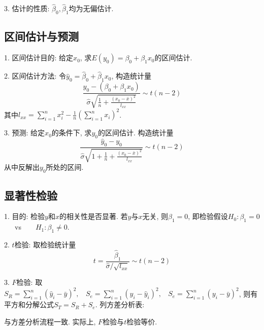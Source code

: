 3. 估计的性质: $\hat{\beta}_0,\hat{\beta}_1$均为无偏估计.

\subsection{区间估计与预测}

1. 区间估计目的: 给定$x_0$, 求$E(y_0)=\beta_0+\beta_1x_0$的区间估计.

2. 区间估计方法: 令$\hat{y}_0=\hat{\beta}_0+\hat{\beta}_1 x_0$, 构造统计量
\begin{equation*}
    \frac{\hat{y}_0-(\beta_0+\beta_1 x_0)}{\hat{\sigma}\sqrt{\frac{1}{n}+\frac{(x_0-\bar{x})^2}{l_{xx}}}} \sim t(n-2)
\end{equation*}
其中$l_{xx}=\sum\limits_{i=1}^n x_i^2-\frac{1}{n}(\sum\limits_{i=1}^n x_i)^2$.

3. 预测: 给定$x_0$的条件下, 求$y_0$的区间估计. 构造统计量
\begin{equation*}
    \frac{\hat{y}_0-y_0}{\hat{\sigma}\sqrt{1+\frac{1}{n}+\frac{(x_0-\bar{x})^2}{l_{xx}}}} \sim t(n-2)
\end{equation*}
从中反解出$y_0$所处的区间.

\subsection{显著性检验}

1. 目的: 检验$y$和$x$的相关性是否显著. 若$y$与$x$无关, 则$\beta_1=0$, 即检验假设$H_0:\beta_1=0$~~~vs~~~~$H_1:\beta_1 \neq 0$.

2. $t$检验: 取检验统计量
\begin{equation*}
    t=\frac{\hat{\beta}_1}{\hat{\sigma}/\sqrt{l_{xx}}} \sim t(n-2)
\end{equation*}

3. $F$检验: 取$S_R=\sum\limits_{i=1}^n (\hat{y}_i-\bar{y})^2,~~~~ S_e=\sum\limits_{i=1}^n (y_i-\hat{y}_i)^2,~~~~S_e=\sum\limits_{i=1}^n (y_i-\bar{y})^2$, 则有平方和分解公式$S_T=S_R+S_e$. 列方差分析表:
\begin{table}[H]
\end{table}
与方差分析流程一致. 实际上, $F$检验与$t$检验等价.

